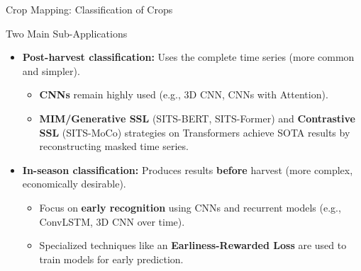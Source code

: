 \begin{frame}{Crop Mapping: Classification of Crops}
    \begin{block}{Two Main Sub-Applications}
        \begin{itemize}
            \item \textbf{Post-harvest classification:} Uses the complete time series (more common and simpler).
                \pause
                \begin{itemize}
                    \item \textbf{CNNs} remain highly used (e.g., 3D CNN, CNNs with Attention).
                    \item \textbf{MIM/Generative SSL} (SITS-BERT, SITS-Former) and \textbf{Contrastive SSL} (SITS-MoCo) strategies on Transformers achieve SOTA results by reconstructing masked time series.
                \end{itemize}
            \pause
            \item \textbf{In-season classification:} Produces results \textbf{before} harvest (more complex, economically desirable).
                \pause
                \begin{itemize}
                    \item Focus on \textbf{early recognition} using CNNs and recurrent models (e.g., ConvLSTM, 3D CNN over time).
                    \item Specialized techniques like an \textbf{Earliness-Rewarded Loss} are used to train models for early prediction.
                \end{itemize}
        \end{itemize}
    \end{block}
\end{frame}
